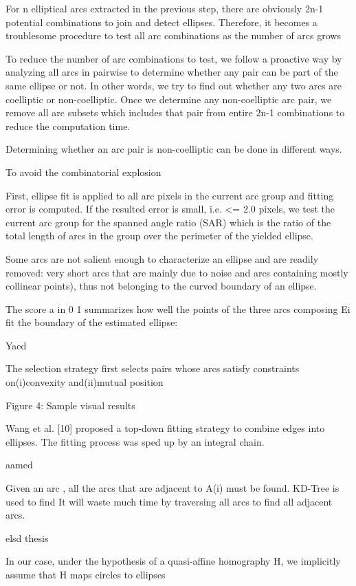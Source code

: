 \documentclass[a4paper]{report}
\begin{document}
For n elliptical arcs extracted in the previous step, there are obviously 2n-1 potential combinations to join and detect ellipses.
Therefore, it becomes a troublesome procedure to test all arc combinations as the number of arcs grows

To reduce the number of arc combinations to test, we follow a proactive way by analyzing all arcs in pairwise to determine whether any pair can be part of the same ellipse or not. In other words, we try to find out whether any
two arcs are coelliptic or non-coelliptic. Once we determine any non-coelliptic arc pair, we remove all arc subsets which includes that pair from entire 2n-1 combinations to reduce the computation time.

Determining whether an arc pair is non-coelliptic can be done in different ways.

To avoid the combinatorial explosion


First, ellipse fit is applied to all arc pixels in the current arc group and fitting error is computed. 
If the resulted error is small, i.e. <= 2.0 pixels, we test the current arc group for the spanned angle ratio
(SAR) which is the ratio of the total length of arcs in the group over the perimeter of the yielded ellipse.


Some arcs are not salient enough to characterize an ellipse
and are readily removed: very short arcs that are
mainly due to noise and arcs containing mostly collinear points), thus not belonging to the curved
boundary of an ellipse.


The score a in 0 1
summarizes how well the points of the three arcs composing Ei fit the boundary of the estimated ellipse:


Yaed

The selection strategy first selects pairs whose arcs satisfy constraints on(i)convexity and(ii)mutual position

Figure 4: Sample visual results


Wang et al. [10] proposed a top-down fitting strategy to combine edges into
ellipses. The fitting process was sped up by an integral
chain.

aamed



Given an arc , all the arcs that are adjacent to A(i) must be found. KD-Tree is used to find
It will waste much
time by traversing all arcs to find all adjacent arcs.

elsd thesis


In our case, under the hypothesis of a
quasi-affine homography H, we implicitly assume that H maps circles to ellipses
\end{document}
